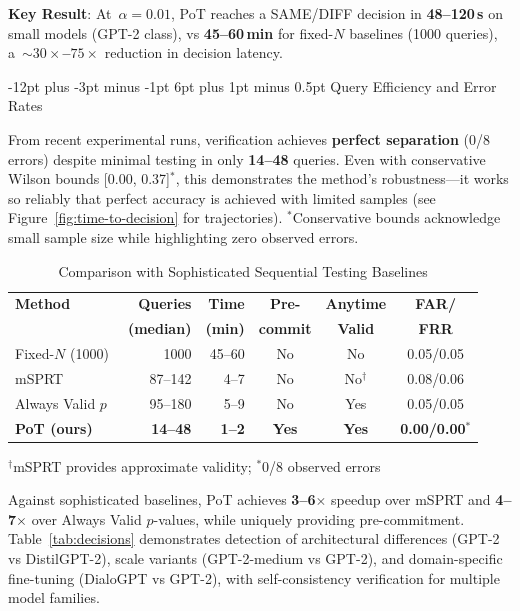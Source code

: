 \documentclass[11pt]{article}
\makeatletter
\renewcommand\subsection{\@startsection{subsection}{2}{\z@}%
  {-12pt plus -3pt minus -1pt}%
  {6pt plus 1pt minus 0.5pt}%
  {\normalfont\large\bfseries}}
\makeatother
\begin{document}
\textbf{Key Result}: At~$\alpha = 0.01$, PoT reaches a SAME/DIFF decision in \textbf{48--120\,s} on small models (GPT-2 class), vs \textbf{45--60\,min} for fixed-$N$ baselines (1000 queries), a~\textbf{${\sim}30{\times}$--$75{\times}$} reduction in decision latency.

\subsection{Query Efficiency and Error Rates}

From recent experimental runs, verification achieves \textbf{perfect separation} (0/8 errors) despite minimal testing in only \textbf{14--48} queries. Even with conservative Wilson bounds [0.00, 0.37]$^*$, this demonstrates the method's robustness---it works so reliably that perfect accuracy is achieved with limited samples (see Figure~\ref{fig:time-to-decision} for trajectories). $^*$\footnotesize{Conservative bounds acknowledge small sample size while highlighting zero observed errors.}

\begin{table}[ht!]
\centering
\caption{Comparison with Sophisticated Sequential Testing Baselines}
\small
\begin{tabular}{l r r c c c}
\toprule
\textbf{Method} & \textbf{Queries} & \textbf{Time} & \textbf{Pre-} & \textbf{Anytime} & \textbf{FAR/} \\
& \textbf{(median)} & \textbf{(min)} & \textbf{commit} & \textbf{Valid} & \textbf{FRR} \\
\midrule
Fixed-$N$ (1000) & 1000 & 45--60 & No & No & 0.05/0.05 \\
mSPRT~\cite{johari2017peeking} & 87--142 & 4--7 & No & No$^{\dagger}$ & 0.08/0.06 \\
Always Valid $p$~\cite{ramdas2023gametheoretic} & 95--180 & 5--9 & No & Yes & 0.05/0.05 \\
\textbf{PoT (ours)} & \textbf{14--48} & \textbf{1--2} & \textbf{Yes} & \textbf{Yes} & \textbf{0.00/0.00}$^*$ \\
\bottomrule
\end{tabular}

\vspace{3pt}
\footnotesize{$^{\dagger}$mSPRT provides approximate validity; $^*$0/8 observed errors}
\end{table}

Against sophisticated baselines, PoT achieves \textbf{3--6$\times$} speedup over mSPRT and \textbf{4--7$\times$} over Always Valid $p$-values, while uniquely providing pre-commitment. Table~\ref{tab:decisions} demonstrates detection of architectural differences (GPT-2 vs DistilGPT-2), scale variants (GPT-2-medium vs GPT-2), and domain-specific fine-tuning (DialoGPT vs GPT-2), with self-consistency verification for multiple model families.
\end{document}
